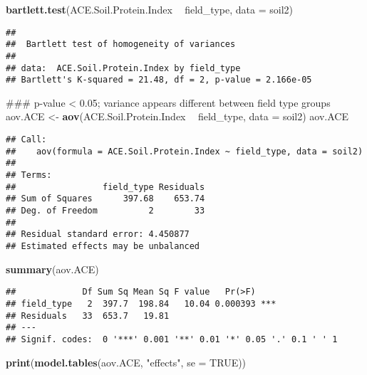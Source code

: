 \documentclass[]{article}
\newenvironment{Shaded}{\begin{snugshade}}{\end{snugshade}}
\newcommand{\KeywordTok}[1]{\textcolor[rgb]{0.13,0.29,0.53}{\textbf{#1}}}
\newcommand{\DataTypeTok}[1]{\textcolor[rgb]{0.13,0.29,0.53}{#1}}
\newcommand{\StringTok}[1]{\textcolor[rgb]{0.31,0.60,0.02}{#1}}
\newcommand{\OtherTok}[1]{\textcolor[rgb]{0.56,0.35,0.01}{#1}}
\newcommand{\OperatorTok}[1]{\textcolor[rgb]{0.81,0.36,0.00}{\textbf{#1}}}
\newcommand{\NormalTok}[1]{#1}
\begin{document}
\begin{Shaded}
\begin{Highlighting}[]
\KeywordTok{bartlett.test}\NormalTok{(ACE.Soil.Protein.Index }\OperatorTok{~}\StringTok{ }\NormalTok{field_type, }\DataTypeTok{data =}\NormalTok{ soil2)}
\end{Highlighting}
\end{Shaded}

\begin{verbatim}
## 
##  Bartlett test of homogeneity of variances
## 
## data:  ACE.Soil.Protein.Index by field_type
## Bartlett's K-squared = 21.48, df = 2, p-value = 2.166e-05
\end{verbatim}

\begin{Shaded}
\begin{Highlighting}[]
\NormalTok{### p-value < 0.05; variance appears different between field type groups}
\NormalTok{aov.ACE <-}\StringTok{ }\KeywordTok{aov}\NormalTok{(ACE.Soil.Protein.Index }\OperatorTok{~}\StringTok{ }\NormalTok{field_type, }\DataTypeTok{data =}\NormalTok{ soil2)}
\NormalTok{aov.ACE}
\end{Highlighting}
\end{Shaded}

\begin{verbatim}
## Call:
##    aov(formula = ACE.Soil.Protein.Index ~ field_type, data = soil2)
## 
## Terms:
##                 field_type Residuals
## Sum of Squares      397.68    653.74
## Deg. of Freedom          2        33
## 
## Residual standard error: 4.450877
## Estimated effects may be unbalanced
\end{verbatim}

\begin{Shaded}
\begin{Highlighting}[]
\KeywordTok{summary}\NormalTok{(aov.ACE)}
\end{Highlighting}
\end{Shaded}

\begin{verbatim}
##             Df Sum Sq Mean Sq F value   Pr(>F)    
## field_type   2  397.7  198.84   10.04 0.000393 ***
## Residuals   33  653.7   19.81                     
## ---
## Signif. codes:  0 '***' 0.001 '**' 0.01 '*' 0.05 '.' 0.1 ' ' 1
\end{verbatim}

\begin{Shaded}
\begin{Highlighting}[]
\KeywordTok{print}\NormalTok{(}\KeywordTok{model.tables}\NormalTok{(aov.ACE, }\StringTok{"effects"}\NormalTok{, }\DataTypeTok{se =} \OtherTok{TRUE}\NormalTok{))}
\end{Highlighting}
\end{Shaded}
\end{document}
